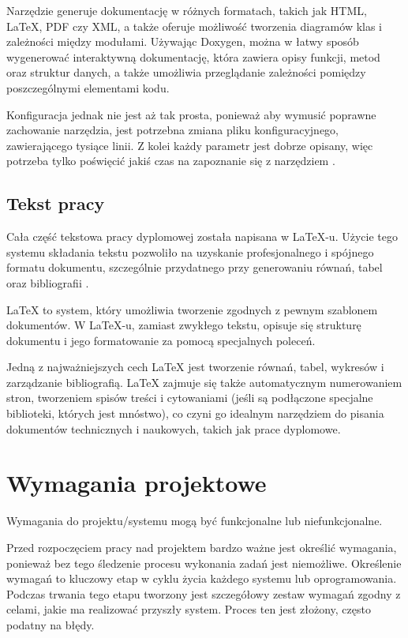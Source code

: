 Narzędzie generuje dokumentację w różnych formatach, takich jak HTML, \LaTeX, PDF czy XML, a także oferuje możliwość tworzenia diagramów klas i zależności między modułami. Używając Doxygen, można w łatwy sposób wygenerować interaktywną dokumentację, która zawiera opisy funkcji, metod oraz struktur danych, a także umożliwia przeglądanie zależności pomiędzy poszczególnymi elementami kodu.

Konfiguracja jednak nie jest aż tak prosta, ponieważ aby wymusić poprawne zachowanie narzędzia, jest potrzebna zmiana pliku konfiguracyjnego, zawierającego tysiące linii. Z kolei każdy parametr jest dobrze opisany, więc potrzeba tylko poświęcić jakiś czas na zapoznanie się z narzędziem \cite{doxygen_config}.

\subsection{Tekst pracy}
Cała część tekstowa pracy dyplomowej została napisana w \LaTeX-u. Użycie tego systemu składania tekstu pozwoliło na uzyskanie profesjonalnego i spójnego formatu dokumentu, szczególnie przydatnego przy generowaniu równań, tabel oraz bibliografii \cite{latex}.

\LaTeX{} to system, który umożliwia tworzenie zgodnych z pewnym szablonem dokumentów. W \LaTeX-u, zamiast zwykłego tekstu, opisuje się strukturę dokumentu i jego formatowanie za pomocą specjalnych poleceń.

Jedną z najważniejszych cech \LaTeX{} jest tworzenie równań, tabel, wykresów i zarządzanie bibliografią. \LaTeX{} zajmuje się także automatycznym numerowaniem stron, tworzeniem spisów treści i cytowaniami (jeśli są podłączone specjalne biblioteki, których jest mnóstwo), co czyni go idealnym narzędziem do pisania dokumentów technicznych i naukowych, takich jak prace dyplomowe.

\section{Wymagania projektowe}
Wymagania do projektu/systemu mogą być funkcjonalne lub niefunkcjonalne.

Przed rozpoczęciem pracy nad projektem bardzo ważne jest określić wymagania, ponieważ bez tego śledzenie procesu wykonania zadań jest niemożliwe. Określenie wymagań to kluczowy etap w cyklu życia każdego systemu lub oprogramowania. Podczas trwania tego etapu tworzony jest szczegółowy zestaw wymagań zgodny z celami, jakie ma realizować przyszły system. Proces ten jest złożony, często podatny na błędy.


